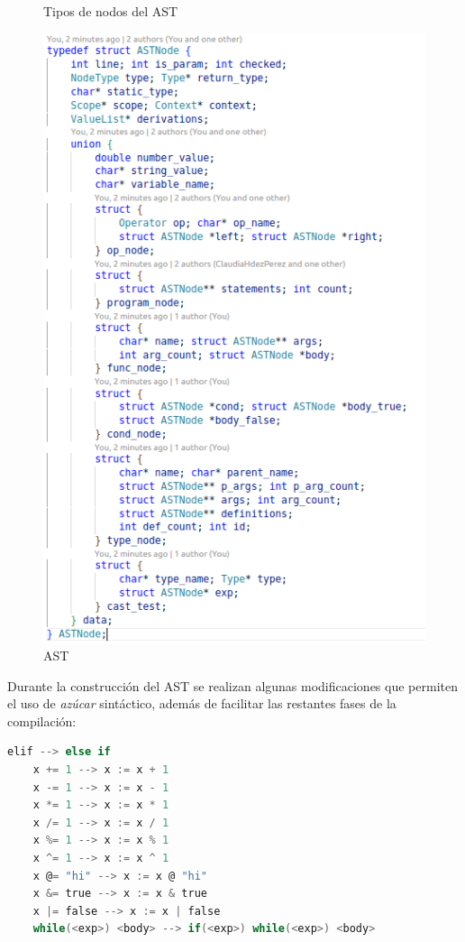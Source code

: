 \documentclass{llncs}
\begin{document}
\begin{figure}[h]
\begin{minipage}{0.3\textwidth}
    \caption{Tipos de nodos del AST}
    \label{fig:nodos_ast}
\end{minipage}\hfill
\begin{minipage}{0.48\textwidth}
    \centering
    \includegraphics[width=\textwidth]{images/ast.png}
    \caption{AST}
    \label{fig:ast}
\end{minipage}
\end{figure}

Durante la construcción del AST se realizan algunas modificaciones que permiten el uso de \textit{azúcar} sintáctico, además de facilitar las restantes fases de 
la compilación: 

\begin{lstlisting}[language=C]
    elif --> else if
    x += 1 --> x := x + 1
    x -= 1 --> x := x - 1
    x *= 1 --> x := x * 1
    x /= 1 --> x := x / 1
    x %= 1 --> x := x % 1
    x ^= 1 --> x := x ^ 1
    x @= "hi" --> x := x @ "hi"
    x &= true --> x := x & true
    x |= false --> x := x | false
    while(<exp>) <body> --> if(<exp>) while(<exp>) <body>
    \end{lstlisting}
\end{document}
